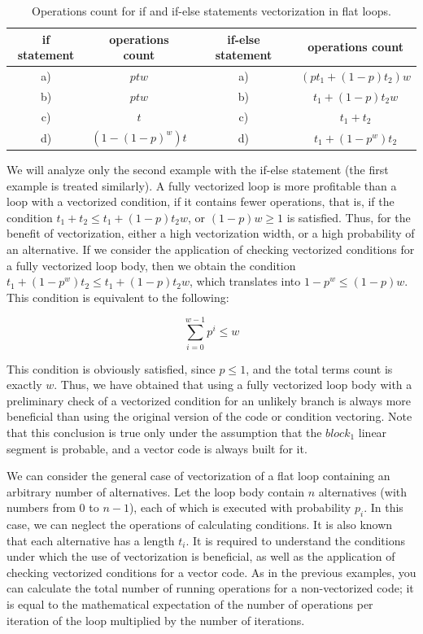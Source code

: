 \documentclass[
11pt,%
tightenlines,%
twoside,%
onecolumn,%
nofloats,%
nobibnotes,%
nofootinbib,%
superscriptaddress,%
noshowpacs,%
centertags]%
{revtex4}
\begin{document}
\begin{table}[!h]
\setcaptionmargin{0mm}
\onelinecaptionsfalse
{}
\caption{Operations count for if and if-else statements vectorization in flat loops.}
\bigskip
\begin{tabular}{|c|c|c|c|}
\hline
if statement & operations count & if-else statement & operations count \\
\hline
a) & $ptw$ & a) & $\left( pt_1 + (1 - p)t_2 \right)w$ \\
b) & $ptw$ & b) & $t_1 + (1 - p)t_2w$ \\
c) & $t$ & c) & $t_1 + t_2$ \\
d) & $\left( 1 - (1 - p)^w \right)t$ & d) & $t_1 + (1 - p^w)t_2$ \\
\hline
\end{tabular}
\label{tab:flat}
\end{table}

We will analyze only the second example with the if-else statement (the first example is treated similarly).
A fully vectorized loop is more profitable than a loop with a vectorized condition, if it contains fewer operations, that is, if the condition $t_1 + t_2 \le t_1 + (1 - p) t_2w$, or $(1 - p) w \ge 1$ is satisfied.
Thus, for the benefit of vectorization, either a high vectorization width, or a high probability of an alternative.
If we consider the application of checking vectorized conditions for a fully vectorized loop body, then we obtain the condition $t_1 + (1 - p ^ w) t_2 \le t_1 + (1 - p) t_2w$, which translates into $1 - p ^ w \le (1 - p) w$.
This condition is equivalent to the following:

\begin{equation}
\sum_{i = 0}^{w - 1}{p^i} \le w
\end{equation}

This condition is obviously satisfied, since $p \le 1$, and the total terms count is exactly $w$.
Thus, we have obtained that using a fully vectorized loop body with a preliminary check of a vectorized condition for an unlikely branch is always more beneficial than using the original version of the code or condition vectoring.
Note that this conclusion is true only under the assumption that the $block_1$ linear segment is probable, and a vector code is always built for it.

We can consider the general case of vectorization of a flat loop containing an arbitrary number of alternatives.
Let the loop body contain $n$ alternatives (with numbers from 0 to $n - 1$), each of which is executed with probability $p_i$.
In this case, we can neglect the operations of calculating conditions.
It is also known that each alternative has a length $t_i$.
It is required to understand the conditions under which the use of vectorization is beneficial, as well as the application of checking vectorized conditions for a vector code.
As in the previous examples, you can calculate the total number of running operations for a non-vectorized code; it is equal to the mathematical expectation of the number of operations per iteration of the loop multiplied by the number of iterations.
\end{document}
